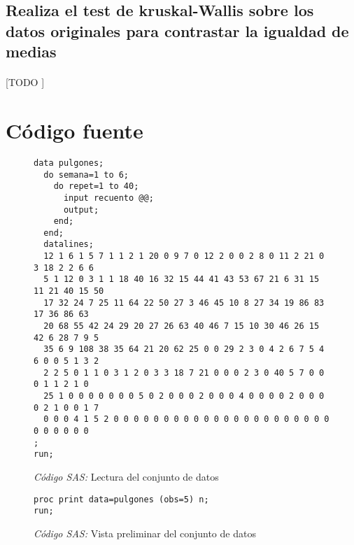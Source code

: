 \documentclass[11pt]{article}
\begin{document}
    \subsection{Realiza el test de kruskal-Wallis sobre los datos originales para contrastar la igualdad de medias}
    \label{sec:e5}
      \paragraph{}
      [TODO ]

  \section{Código fuente}
  \label{sec:code}

    \begin{figure}
      \centering
      \begin{verbatim}
data pulgones;
  do semana=1 to 6;
    do repet=1 to 40;
      input recuento @@;
      output;
    end;
  end;
  datalines;
  12 1 6 1 5 7 1 1 2 1 20 0 9 7 0 12 2 0 0 2 8 0 11 2 21 0 3 18 2 2 6 6
  5 1 12 0 3 1 1 18 40 16 32 15 44 41 43 53 67 21 6 31 15 11 21 40 15 50
  17 32 24 7 25 11 64 22 50 27 3 46 45 10 8 27 34 19 86 83 17 36 86 63
  20 68 55 42 24 29 20 27 26 63 40 46 7 15 10 30 46 26 15 42 6 28 7 9 5
  35 6 9 108 38 35 64 21 20 62 25 0 0 29 2 3 0 4 2 6 7 5 4 6 0 0 5 1 3 2
  2 2 5 0 1 1 0 3 1 2 0 3 3 18 7 21 0 0 0 2 3 0 40 5 7 0 0 0 1 1 2 1 0
  25 1 0 0 0 0 0 0 0 5 0 2 0 0 0 2 0 0 0 4 0 0 0 0 2 0 0 0 0 2 1 0 0 1 7
  0 0 0 4 1 5 2 0 0 0 0 0 0 0 0 0 0 0 0 0 0 0 0 0 0 0 0 0 0 0 0 0 0 0 0
;
run;
      \end{verbatim}
      \caption{\emph{Código SAS:} Lectura del conjunto de datos}
      \label{code:sas_1}
    \end{figure}


    \begin{figure}
      \centering
      \begin{verbatim}
proc print data=pulgones (obs=5) n;
run;
      \end{verbatim}
      \caption{\emph{Código SAS:} Vista preliminar del conjunto de datos}
      \label{code:sas_2}
    \end{figure}


    \nocite{rano2017}

    
    
\end{document}

